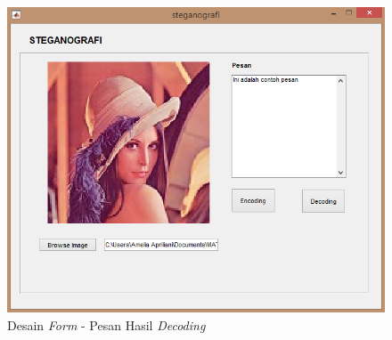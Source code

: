 	\begin{figure}[H]
		\centering
		\includegraphics[width=1\textwidth]{gambar/mockup/5}
		\caption{Desain \emph{Form} - Pesan Hasil \emph{Decoding}}
		\label{desain_pesan}
	\end{figure}
